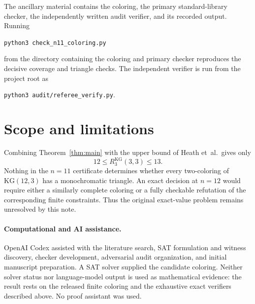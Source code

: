 \documentclass[11pt]{article}
\newcommand{\KG}{\mathrm{KG}}
\begin{document}
The ancillary material contains the coloring, the primary standard-library
checker, the independently written audit verifier, and its recorded output.
Running
\begin{center}
  \verb|python3 check_n11_coloring.py|
\end{center}
from the directory containing the coloring and primary checker reproduces
the decisive coverage and triangle checks.  The independent verifier is
run from the project root as
\begin{center}
  \verb|python3 audit/referee_verify.py|.
\end{center}

\section{Scope and limitations}

Combining Theorem~\ref{thm:main} with the upper bound of Heath et~al.\ gives
only
\[
  12\leq R^{\mathrm{KG}}_{3}(3,3)\leq 13.
\]
Nothing in the $n=11$ certificate determines whether every two-coloring of
$\KG(12,3)$ has a monochromatic triangle.  An exact decision at $n=12$
would require either a similarly complete coloring or a fully checkable
refutation of the corresponding finite constraints.  Thus the original
exact-value problem remains unresolved by this note.

\paragraph{Computational and AI assistance.}
OpenAI Codex assisted with the literature search, SAT formulation and
witness discovery, checker development, adversarial audit organization, and
initial manuscript preparation.  A SAT solver supplied the candidate
coloring.  Neither solver status nor language-model output is used as
mathematical evidence: the result rests on the released finite coloring and
the exhaustive exact verifiers described above.  No proof assistant was
used.



\end{document}

